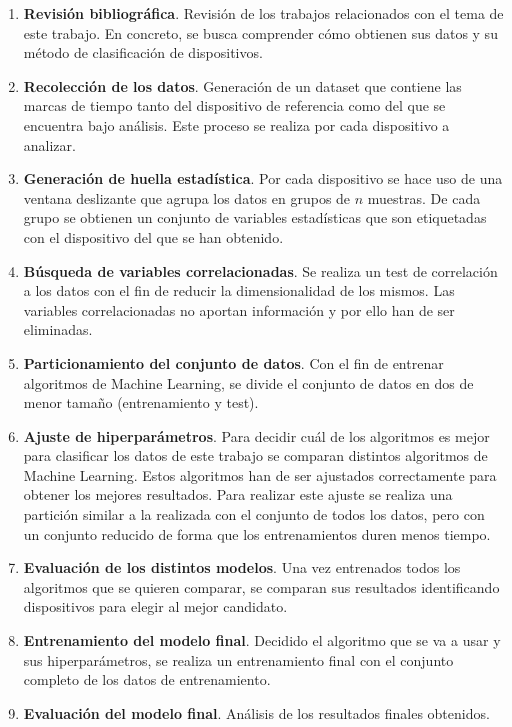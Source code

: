\begin{enumerate}
    \item \textbf{Revisión bibliográfica}. Revisión de los trabajos relacionados con el tema de este trabajo. En concreto, se busca comprender cómo obtienen sus datos y su método de clasificación de dispositivos.
    \item \textbf{Recolección de los datos}. Generación de un dataset que contiene las marcas de tiempo tanto del dispositivo de referencia como del que se encuentra bajo análisis. Este proceso se realiza por cada dispositivo a analizar.
    \item \textbf{Generación de huella estadística}. Por cada dispositivo se hace uso de una ventana deslizante que agrupa los datos en grupos de $n$ muestras. De cada grupo se obtienen un conjunto de variables estadísticas que son etiquetadas con el dispositivo del que se han obtenido.
    \item \textbf{Búsqueda de variables correlacionadas}. Se realiza un test de correlación a los datos con el fin de reducir la dimensionalidad de los mismos. Las variables correlacionadas no aportan información y por ello han de ser eliminadas.
    \item \textbf{Particionamiento del conjunto de datos}. Con el fin de entrenar algoritmos de Machine Learning, se divide el conjunto de datos en dos de menor tamaño (entrenamiento y test).
    \item \textbf{Ajuste de hiperparámetros}. Para decidir cuál de los algoritmos es mejor para clasificar los datos de este trabajo se comparan distintos algoritmos de Machine Learning. Estos algoritmos han de ser ajustados correctamente para obtener los mejores resultados. Para realizar este ajuste se realiza una partición similar a la realizada con el conjunto de todos los datos, pero con un conjunto reducido de forma que los entrenamientos duren menos tiempo.
    \item \textbf{Evaluación de los distintos modelos}. Una vez entrenados todos los algoritmos que se quieren comparar, se comparan sus resultados identificando dispositivos para elegir al mejor candidato.
    \item \textbf{Entrenamiento del modelo final}. Decidido el algoritmo que se va a usar y sus hiperparámetros, se realiza un entrenamiento final con el conjunto completo de los datos de entrenamiento.
    \item \textbf{Evaluación del modelo final}. Análisis de los resultados finales obtenidos.
\end{enumerate}
